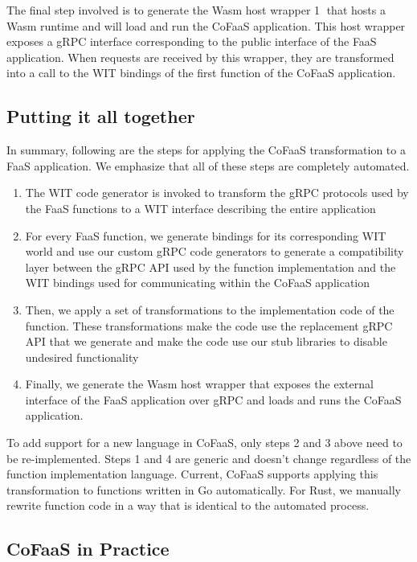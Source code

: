 The final step involved is to generate the Wasm host wrapper \textcircled{1} that hosts a Wasm runtime and will load and run the CoFaaS application. This host wrapper exposes a gRPC interface corresponding to the public interface of the FaaS application. When requests are received by this wrapper, they are transformed into a call to the WIT bindings of the first function of the CoFaaS application.

\subsection{Putting it all together}
\label{es:subsec:cofaas-overview}

In summary, following are the steps for applying the CoFaaS transformation to a FaaS application. We emphasize that all of these steps are completely automated.

\begin{enumerate}
\item The WIT code generator is invoked to transform the gRPC protocols used by the FaaS functions to a WIT interface describing the entire application 
\item For every FaaS function, we generate bindings for its corresponding WIT world and use our custom gRPC code generators to generate a compatibility layer between the gRPC API used by the function implementation and the WIT bindings used for communicating within the CoFaaS application
\item Then, we apply a set of transformations to the implementation code of the function. These transformations make the code use the replacement gRPC API that we generate and make the code use our stub libraries to disable undesired functionality
  \item  Finally, we generate the Wasm host wrapper that exposes the external interface of the FaaS application over gRPC and loads and runs the CoFaaS application.
\end{enumerate}

To add support for a new language in CoFaaS, only steps 2 and 3 above need to be re-implemented. Steps 1 and 4 are generic and doesn't change regardless of the function implementation language. Current, CoFaaS supports applying this transformation to functions written in Go automatically. For Rust, we manually rewrite function code in a way that is identical to the automated process.

\subsection{CoFaaS in Practice}
\label{es:subsec:practice}

